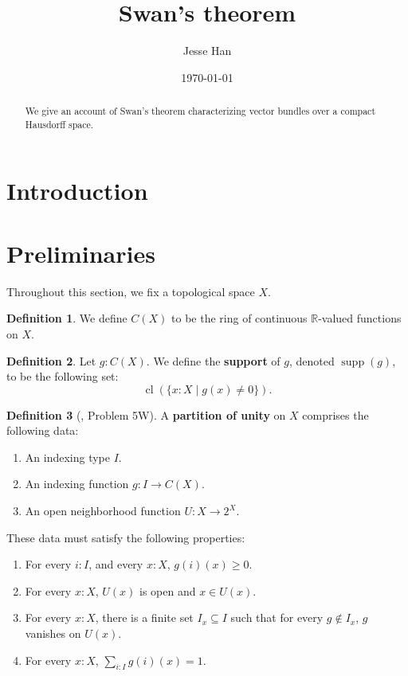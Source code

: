 \documentclass[11pt]{article}
\newcommand{\R}{\mathbb{R}}
\theoremstyle{plain}
\theoremstyle{definition}
\newtheorem{definition}{Definition}[section]
\newcommand{\cl}{\operatorname{cl}}
\newcommand{\supp}{\operatorname{supp}}
\begin{document}
\title{Swan's theorem}
\author{Jesse Han}
\date{\today}

\maketitle

\begin{abstract}
We give an account of Swan's theorem characterizing vector bundles over a compact Hausdorff space.
\end{abstract}

\section*{Introduction}

\section{Preliminaries}
Throughout this section, we fix a topological space \(X\).


\begin{definition}\label{def:cts-functions}
  We define \(C(X)\) to be the ring of continuous \(\R\)-valued functions on \(X\).
\end{definition}

\begin{definition}\label{def:support}
  Let \(g : C(X)\). We define the \textbf{support} of \(g\), denoted \(\supp(g)\), to be the following set:
  \[ \cl \left( \{ x : X \mid g(x) \neq 0 \} \right).\]
\end{definition}

\begin{definition}[\cite{kelley2017general}, Problem 5W]\label{def:partition-of-unity}
  A \textbf{partition of unity} on \(X\) comprises the following data:
  \begin{enumerate}[label={(\roman*)}]
  \item An indexing type \(I\).
  \item An indexing function \(g : I \to C(X)\).
  \item An open neighborhood function \(U : X \to 2^X\).
  \end{enumerate}

  These data must satisfy the following properties:

  \begin{enumerate}[label={(\alph*)}]
  \item For every \(i : I\), and every \(x : X\), \(g(i)(x) \geq 0\).
  \item For every \(x : X\), \(U(x)\) is open and \(x \in U(x)\).
  \item For every \(x : X\), there is a finite set \(I_x \subseteq I\) such that for every \(g \notin I_x\), \(g\) vanishes on \(U(x)\).
  \item For every \(x : X\), \(\displaystyle \sum_{i : I} g(i)(x) = 1\).
  \end{enumerate}
\end{definition}
\end{document}
